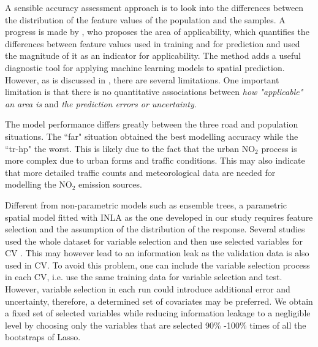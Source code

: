 \documentclass{article}
\begin{document}
A sensible accuracy assessment approach is to look into the differences between the distribution of the feature values  of the population and the samples. A progress is made by \cite{meyer2021predicting}, who proposes the area of applicability, which quantifies the differences between feature values used in training and for prediction and used the magnitude of it as an indicator for applicability. The method adds a useful diagnostic tool for applying machine learning models to spatial prediction. However, as is discussed in \cite{meyer2021predicting}, there are several limitations. One important limitation is that there is no quantitative associations between \textit{how "applicable" an area is} and \textit{the prediction errors or uncertainty}. %



The model performance differs greatly between the three road and population situations. The ``far" situation obtained the best modelling accuracy while the ``tr-hp" the worst. This is likely due to the fact that the urban NO$_2$ process is more complex due to urban forms and traffic conditions. This may also indicate that more detailed traffic counts and meteorological data are needed for modelling the NO$_2$ emission sources.  

Different from non-parametric models such as ensemble trees, a parametric  spatial model fitted with INLA as the one developed in our study requires feature selection and the assumption of the distribution of the response. Several studies used the whole dataset for variable selection and then use selected variables for CV \citep{lu2020land,larkin2017global}. This may however lead to an information leak as the validation data is also used in CV. To avoid this problem, one can include the variable selection process in each CV, i.e. use the same training data for variable selection and test. However, variable selection in each run could introduce additional error and uncertainty, therefore, a determined set of covariates may be preferred. We obtain a fixed set of selected variables while reducing information leakage to a negligible level by choosing only the variables that are selected 90\% -100\% times of all the bootstraps of Lasso.
\end{document}
